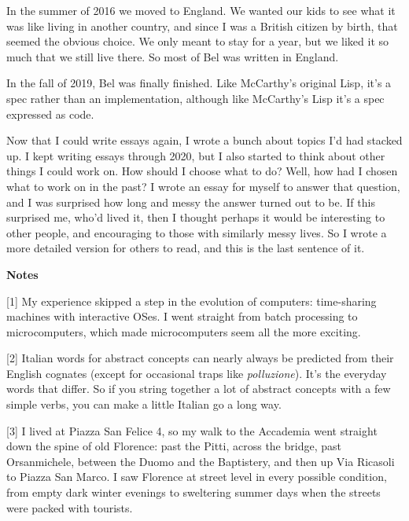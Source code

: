 In the summer of 2016 we moved
                  to England. We wanted our kids to see what it was like living
                  in another country, and since I was a British citizen by
                  birth, that seemed the obvious choice. We only meant to stay
                  for a year, but we liked it so much that we still live there.
                  So most of Bel was written in England.

In the fall
                  of 2019, Bel was finally finished. Like McCarthy's original
                  Lisp, it's a spec rather than an implementation, although like
                  McCarthy's Lisp it's a spec expressed as code.

Now
                  that I could write essays again, I wrote a bunch about topics
                  I'd had stacked up. I kept writing essays through 2020, but I
                  also started to think about other things I could work on. How
                  should I choose what to do? Well, how had I chosen what to
                  work on in the past? I wrote an essay for myself to answer
                  that question, and I was surprised how long and messy the
                  answer turned out to be. If this surprised me, who'd lived it,
                  then I thought perhaps it would be interesting to other
                  people, and encouraging to those with similarly messy lives.
                  So I wrote a more detailed version for others to read, and
                  this is the last sentence of it.










                  \textbf{Notes}

[1] My experience skipped a step in the evolution of computers:
                  time-sharing machines with interactive OSes. I went straight
                  from batch processing to microcomputers, which made
                  microcomputers seem all the more exciting.

[2] Italian words for abstract concepts can nearly always be
                  predicted from their English cognates (except for occasional
                  traps like \emph{polluzione}). It's the everyday words that
                  differ. So if you string together a lot of abstract concepts
                  with a few simple verbs, you can make a little Italian go a
                  long way.

[3] I lived at Piazza San Felice 4, so my walk to the Accademia
                  went straight down the spine of old Florence: past the Pitti,
                  across the bridge, past Orsanmichele, between the Duomo and
                  the Baptistery, and then up Via Ricasoli to Piazza San Marco.
                  I saw Florence at street level in every possible condition,
                  from empty dark winter evenings to sweltering summer days when
                  the streets were packed with tourists.

